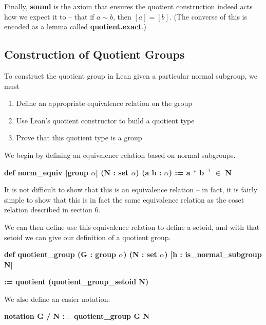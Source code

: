 \documentclass[runningheads,a4paper]{llncs}
\renewcommand{\a}{\alpha}
\renewcommand{\-}{\setminus}
\begin{document}
Finally, \textbf{sound} is the axiom that ensures the quotient construction indeed acts how we expect it to -- that if $a \sim b$, then $[a] = [b]$. (The converse of this is encoded as a lemma called \textbf{quotient.exact}.)

\subsection{Construction of Quotient Groups}

To construct the quotient group in Lean given a particular normal subgroup, we must
\begin{enumerate}
    \item Define an appropriate equivalence relation on the group
    \item Use Lean's quotient constructor to build a quotient type
    \item Prove that this quotient type is a group
\end{enumerate}

We begin by defining an equivalence relation based on normal subgroups.

\vspace{2 mm}
\hspace{2 em}\textbf{def norm\_equiv [group $\a$] (N : set $\a$) (a b : $\a$) := a $*$ b$^{-1}$ $\in$ N}
\vspace{2 mm}

It is not difficult to show that this is an equivalence relation -- in fact, it is fairly simple to show that this is in fact the same equivalence relation as the coset relation described in section 6.

We can then define use this equivalence relation to define a setoid, and with that setoid we can give our definition of a quotient group.

\vspace{2 mm}
\hspace{2 em}\textbf{def quotient\_group (G : group $\a$) (N : set $\a$) [h : is\_normal\_subgroup N]}

\hspace{4 em}\textbf{:= quotient (quotient\_group\_setoid N)}
\vspace{2 mm}

We also define an easier notation:

\vspace{2 mm}
\hspace{2 em}\textbf{notation G / N := quotient\_group G N}
\vspace{2 mm}
\end{document}
